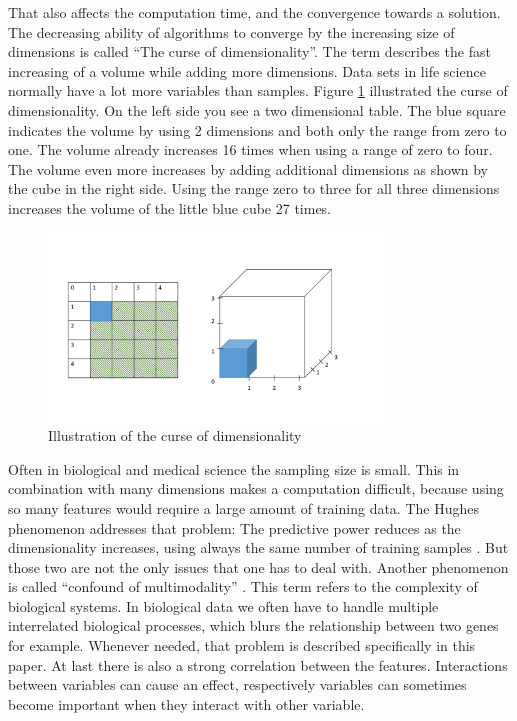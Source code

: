 \documentclass{sig-alternate-05-2015}
\begin{document}
That also affects the computation time, and the convergence towards a solution. The decreasing ability of algorithms to converge by the increasing size of dimensions is called ``The curse of dimensionality''.
The term  describes the fast increasing of a volume while adding more dimensions. Data sets in life science normally have a lot more variables than samples. Figure \ref{fig:curse_dim} illustrated the curse of dimensionality. On the left side you see a two dimensional table. The blue square indicates the volume by using 2 dimensions and both only the range from zero to one. The volume already increases 16 times when using a range of zero to four. The volume even more increases by adding additional dimensions as shown by the cube in the right side. Using the range zero to three for all three dimensions increases the volume of the  little blue cube 27 times.

\begin{figure}
\centering
\includegraphics[width=3.5in]{curse_dim}
\caption{Illustration of the curse of dimensionality}
\label{fig:curse_dim}
\end{figure}

Often in biological and medical science the sampling size is small. This in combination with many dimensions makes a computation difficult, because using so many features would require a large amount of training data. The Hughes phenomenon addresses that problem: The predictive power reduces as the dimensionality increases, using always the same number of training samples \cite{1054102}.
But those two are not the only issues that one has to deal with. Another phenomenon is called ``confound of multimodality'' \cite{clarke2008properties}. This term refers to the complexity of biological systems. In biological data we often have to handle multiple interrelated biological processes, which blurs the relationship between two genes for example. Whenever needed, that problem is described specifically in this paper.
At last there is also a strong correlation between the features. Interactions between variables can cause an effect, respectively variables can sometimes become important when they interact with other variable.
\end{document}
